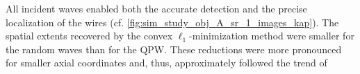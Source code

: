 All incident waves enabled both
the accurate detection and
the precise localization of
the wires
(cf. \cref{fig:sim_study_obj_A_sr_1_images_kap}).
The spatial extents recovered by
the convex $\ell_{1}$-minimization method
 were
smaller for
the random waves than for
the \ac{QPW}.
These reductions were more pronounced for
smaller axial coordinates and, thus, approximately followed
the trend of

